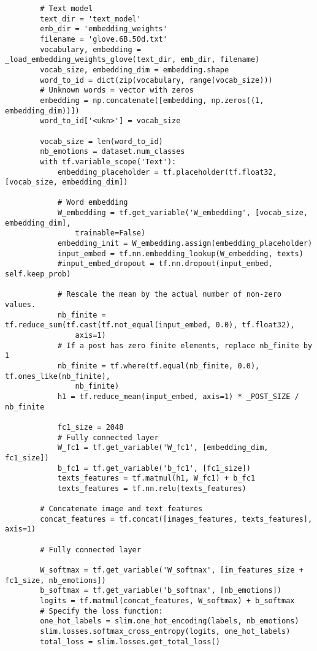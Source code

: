 \begin{lstlisting}
        # Text model
        text_dir = 'text_model'
        emb_dir = 'embedding_weights'
        filename = 'glove.6B.50d.txt'
        vocabulary, embedding = _load_embedding_weights_glove(text_dir, emb_dir, filename)
        vocab_size, embedding_dim = embedding.shape
        word_to_id = dict(zip(vocabulary, range(vocab_size)))
        # Unknown words = vector with zeros
        embedding = np.concatenate([embedding, np.zeros((1, embedding_dim))])
        word_to_id['<ukn>'] = vocab_size

        vocab_size = len(word_to_id)
        nb_emotions = dataset.num_classes
        with tf.variable_scope('Text'):
            embedding_placeholder = tf.placeholder(tf.float32, [vocab_size, embedding_dim])
        
            # Word embedding
            W_embedding = tf.get_variable('W_embedding', [vocab_size, embedding_dim], 
                trainable=False)
            embedding_init = W_embedding.assign(embedding_placeholder)
            input_embed = tf.nn.embedding_lookup(W_embedding, texts)
            #input_embed_dropout = tf.nn.dropout(input_embed, self.keep_prob)

            # Rescale the mean by the actual number of non-zero values.
            nb_finite = tf.reduce_sum(tf.cast(tf.not_equal(input_embed, 0.0), tf.float32), 
                axis=1)
            # If a post has zero finite elements, replace nb_finite by 1
            nb_finite = tf.where(tf.equal(nb_finite, 0.0), tf.ones_like(nb_finite), 
                nb_finite)
            h1 = tf.reduce_mean(input_embed, axis=1) * _POST_SIZE / nb_finite

            fc1_size = 2048
            # Fully connected layer
            W_fc1 = tf.get_variable('W_fc1', [embedding_dim, fc1_size])
            b_fc1 = tf.get_variable('b_fc1', [fc1_size])
            texts_features = tf.matmul(h1, W_fc1) + b_fc1
            texts_features = tf.nn.relu(texts_features)

        # Concatenate image and text features
        concat_features = tf.concat([images_features, texts_features], axis=1)

        # Fully connected layer

        W_softmax = tf.get_variable('W_softmax', [im_features_size + fc1_size, nb_emotions])
        b_softmax = tf.get_variable('b_softmax', [nb_emotions])
        logits = tf.matmul(concat_features, W_softmax) + b_softmax
        # Specify the loss function:
        one_hot_labels = slim.one_hot_encoding(labels, nb_emotions)
        slim.losses.softmax_cross_entropy(logits, one_hot_labels)
        total_loss = slim.losses.get_total_loss()


\end{lstlisting}
